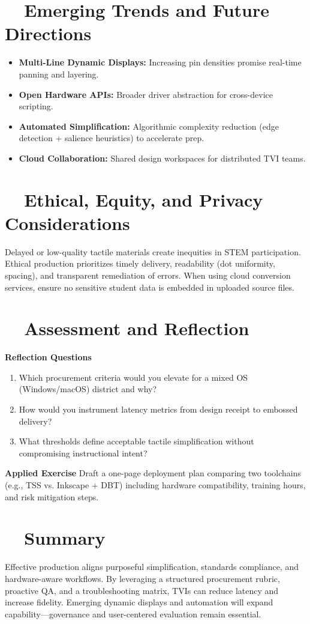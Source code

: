 \section{~~Emerging Trends and Future Directions}\label{ch14:sec:emerging-trends}
\begin{itemize}
	\item \textbf{Multi-Line Dynamic Displays:} Increasing pin densities promise real-time panning and layering.
	\item \textbf{Open Hardware APIs:} Broader driver abstraction for cross-device scripting.
	\item \textbf{Automated Simplification:} Algorithmic complexity reduction (edge detection + salience heuristics) to accelerate prep.
	\item \textbf{Cloud Collaboration:} Shared design workspaces for distributed TVI teams.
\end{itemize}

\section{~~Ethical, Equity, and Privacy Considerations}\label{ch14:sec:ethics-equity}
Delayed or low-quality tactile materials create inequities in STEM participation. Ethical production prioritizes timely delivery, readability (dot uniformity, spacing), and transparent remediation of errors. When using cloud conversion services, ensure no sensitive student data is embedded in uploaded source files.

\section{~~Assessment and Reflection}\label{ch14:sec:assessment-reflection}
\textbf{Reflection Questions}
\begin{enumerate}
	\item Which procurement criteria would you elevate for a mixed OS (Windows/macOS) district and why?
	\item How would you instrument latency metrics from design receipt to embossed delivery?
	\item What thresholds define acceptable tactile simplification without compromising instructional intent?
\end{enumerate}
\textbf{Applied Exercise} Draft a one-page deployment plan comparing two toolchains (e.g., TSS vs. Inkscape + DBT) including hardware compatibility, training hours, and risk mitigation steps.

\section{~~Summary}\label{ch14:sec:summary}
Effective  production aligns purposeful simplification, standards compliance, and hardware-aware workflows. By leveraging a structured procurement rubric, proactive QA, and a troubleshooting matrix, TVIs can reduce latency and increase fidelity. Emerging dynamic displays and automation will expand capability—governance and user-centered evaluation remain essential.

